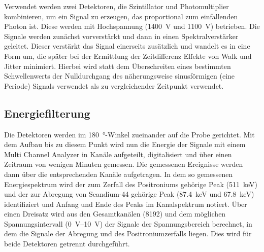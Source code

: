 \documentclass[
	a4paper,
	12pt,
	pagesize,
	ngerman
]{scrartcl}
\begin{document}

	Verwendet werden zwei Detektoren, die Szintillator und Photomultiplier kombinieren, um ein Signal zu erzeugen, das proportional zum einfallenden Photon ist.
	Diese werden mit Hochspannung (\SI{1400}{V} und \SI{1100}{V}) betrieben.
	Die Signale werden zunächst vorverstärkt und dann in einen Spektralverstärker geleitet.
	Dieser verstärkt das Signal einerseits zusätzlich und wandelt es in eine Form um, die später bei der Ermittlung der Zeitdifferenz Effekte von Walk und Jitter minimiert.
	Hierbei wird statt dem Überschreiten eines bestimmten Schwellenwerts der Nulldurchgang des näherungsweise sinusförmigen (eine Periode) Signals verwendet als zu vergleichender Zeitpunkt verwendet. %

	\subsection{Energiefilterung}

	Die Detektoren werden im \SI{180}{\degree}-Winkel zueinander auf die Probe gerichtet.
	Mit dem Aufbau bis zu diesem Punkt wird nun die Energie der Signale mit einem Multi Channel Analyzer in Kanäle aufgeteilt, digitalisiert und über einen Zeitraum von wenigen Minuten gemessen. %
	Die gemessenen Ereignisse werden dann über die entsprechenden Kanäle aufgetragen.
	In dem so gemessenen Energiespektrum wird der zum Zerfall des Positroniums gehörige Peak (\SI{511}{keV}) und der zur Abregung von Scandium-44 gehörige Peak (\SI{87,4}{keV} und \SI{67,8}{keV}) identifiziert und Anfang und Ende des Peaks im Kanalspektrum notiert.
	Über einen Dreisatz wird aus den Gesamtkanälen (8192) und dem möglichen Spannungsintervall (\SIrange{0}{10}{\volt}) der Signale der Spannungsbereich berechnet, in dem die Signale der Abregung und des Positroniumzerfalls liegen.
	Dies wird für beide Detektoren getrennt durchgeführt.
\end{document}
